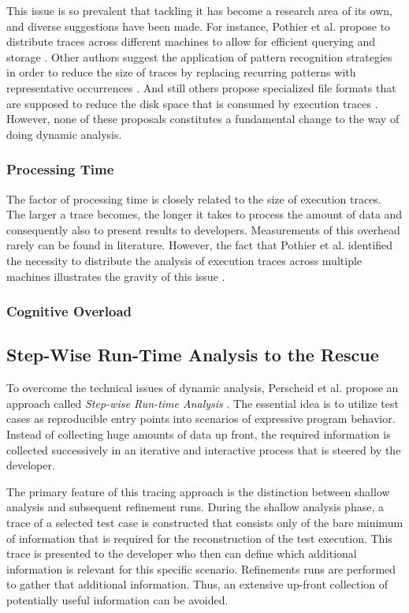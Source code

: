 This issue is so prevalent that tackling it has become a research area of its own, and diverse suggestions have been made.
For instance, Pothier et al. propose to distribute traces across different machines to allow for efficient querying and storage \cite{pothier_scalable_2007}.
Other authors suggest the application of pattern recognition strategies in order to reduce the size of traces by replacing recurring patterns with representative occurrences .
And still others propose specialized file formats that are supposed to reduce the disk space that is consumed by execution traces .
However, none of these proposals constitutes a fundamental change to the way of doing dynamic analysis.

\subsubsection{Processing Time}
The factor of processing time is closely related to the size of execution traces.
The larger a trace becomes, the longer it takes to process the amount of data and consequently also to present results to developers.
Measurements of this overhead rarely can be found in literature.
However, the fact that Pothier et al. identified the necessity to distribute the analysis of execution traces across multiple machines illustrates the gravity of this issue \cite{pothier_scalable_2007}.

\subsubsection{Cognitive Overload}

\subsection{Step-Wise Run-Time Analysis to the Rescue}
\label{ss:BackgroundTracing}
To overcome the technical issues of dynamic analysis, Perscheid et al. propose an approach called \emph{Step-wise Run-time Analysis} \citep{perscheid_immediacy_2010, perscheid_test-driven_2013}.
The essential idea is to utilize test cases as reproducible entry points into scenarios of expressive program behavior.
Instead of collecting huge amounts of data up front, the required information is collected successively in an iterative and interactive process that is steered by the developer.

The primary feature of this tracing approach is the distinction between shallow analysis and subsequent refinement runs.
During the shallow analysis phase, a trace of a selected test case is constructed that consists only of the bare minimum of information that is required for the reconstruction of the test execution.
This trace is presented to the developer who then can define which additional information is relevant for this specific scenario.
Refinements runs are performed to gather that additional information.
Thus, an extensive up-front collection of potentially useful information can be avoided.


